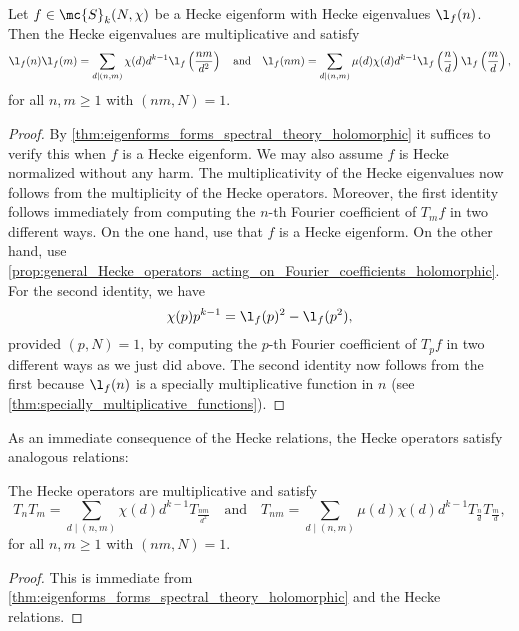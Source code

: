     \begin{proposition}
    Let $f \in \mc{S}_{k}(N,\chi)$ be a Hecke eigenform with Hecke eigenvalues $\l_{f}(n)$. Then the Hecke eigenvalues are multiplicative and satisfy
    \[
      \l_{f}(n)\l_{f}(m) = \sum_{d \mid (n,m)}\chi(d)d^{k-1}\l_{f}\left(\frac{nm}{d^{2}}\right) \quad \text{and} \quad \l_{f}(nm) = \sum_{d \mid (n,m)}\mu(d)\chi(d)d^{k-1}\l_{f}\left(\frac{n}{d}\right)\l_{f}\left(\frac{m}{d}\right),
    \]
    for all $n,m \ge 1$ with $(nm,N) = 1$.
    \end{proposition}
    \begin{proof}
      By \cref{thm:eigenforms_forms_spectral_theory_holomorphic} it suffices to verify this when $f$ is a Hecke eigenform. We may also assume $f$ is Hecke normalized without any harm. The multiplicativity of the Hecke eigenvalues now follows from the multiplicity of the Hecke operators. Moreover, the first identity follows immediately from computing the $n$-th Fourier coefficient of $T_{m}f$ in two different ways. On the one hand, use that $f$ is a Hecke eigenform. On the other hand, use \cref{prop:general_Hecke_operators_acting_on_Fourier_coefficients_holomorphic}. For the second identity, we have
      \[
        \chi(p)p^{k-1} = \l_{f}(p)^{2}-\l_{f}(p^{2}),
      \]
      provided $(p,N) = 1$, by computing the $p$-th Fourier coefficient of $T_{p}f$ in two different ways as we just did above. The second identity now follows from the first because $\l_{f}(n)$ is a specially multiplicative function in $n$ (see \cref{thm:specially_multiplicative_functions}).
    \end{proof}

    As an immediate consequence of the Hecke relations, the Hecke operators satisfy analogous relations:

    \begin{corollary}\label{cor:Hecke_relations_operator_holomorphic}
      The Hecke operators are multiplicative and satisfy
      \[
        T_{n}T_{m} = \sum_{d \mid (n,m)}\chi(d)d^{k-1}T_{\frac{nm}{d^{2}}} \quad \text{and} \quad T_{nm} = \sum_{d \mid (n,m)}\mu(d)\chi(d)d^{k-1}T_{\frac{n}{d}}T_{\frac{m}{d}},
      \]
      for all $n,m \ge 1$ with $(nm,N) = 1$.
    \end{corollary}
    \begin{proof}
      This is immediate from \cref{thm:eigenforms_forms_spectral_theory_holomorphic} and the Hecke relations.
    \end{proof}

